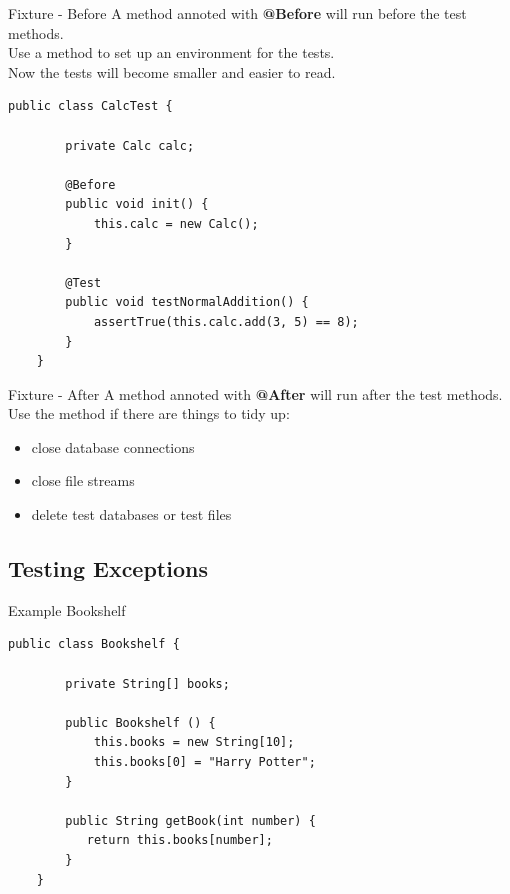 \begin{frame}[fragile]{Fixture - Before}
	A method annoted with \textbf{@Before} will run before the test methods. \\
	Use a method to set up an environment for the tests. \\
	Now the tests will become smaller and easier to read.
	\begin{lstlisting}[basicstyle=\ttfamily\scriptsize, escapechar=!]
	public class CalcTest {
	
	    private Calc calc;
	    
	    @Before
	    public void init() {
	        this.calc = new Calc();	    
	    }
	    
	    @Test
	    public void testNormalAddition() {
	        assertTrue(this.calc.add(3, 5) == 8);
	    }
	}
	\end{lstlisting}
\end{frame}

\begin{frame}[fragile]{Fixture - After}
	A method annoted with \textbf{@After} will run after the test methods. \\
	Use the method if there are things to tidy up:
	\begin{itemize}
		\item close database connections
		\item close file streams
		\item delete test databases or test files
	\end{itemize}
\end{frame}

\subsection{Testing Exceptions}
\begin{frame}[fragile]{Example Bookshelf}
	\begin{lstlisting}[basicstyle=\ttfamily\scriptsize]
	public class Bookshelf {
	
	    private String[] books;
	
	    public Bookshelf () {
	        this.books = new String[10];
	        this.books[0] = "Harry Potter";
	    }

	    public String getBook(int number) {
	       return this.books[number];
	    }
	}
	\end{lstlisting}
\end{frame}

